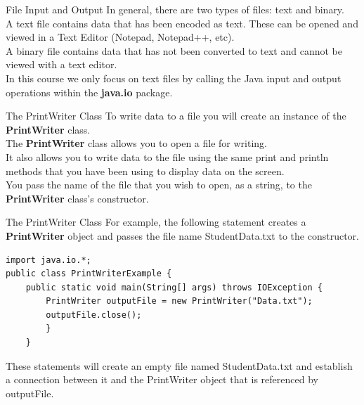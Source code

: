 \documentclass[11pt]{beamer}
\begin{document}
\begin{frame}{File Input and Output}
    In general, there are two types of files: text and binary. \\ 
    \vspace{1em}
    A text file contains data that has been encoded as text. These can be opened and viewed in a Text Editor (Notepad, Notepad++, etc). \\ 
    \vspace{1em}
    A binary file contains data that has not been converted to text and cannot be viewed with a text editor. \\ 
    \vspace{1em}
    In this course we only focus on text files by calling the Java input and output operations within the \textbf{java.io} package.
\end{frame}

\begin{frame}{The PrintWriter Class}
    To write data to a file you will create an instance of the \textbf{PrintWriter} class. \\
    \vspace{1em}
    The \textbf{PrintWriter} class allows you to open a file for writing. \\
    \vspace{1em}
    It also allows you to write data to the file using the same print and println methods that you have been using to display data on the screen. \\
    \vspace{1em}
    You pass the name of the file that you wish to open, as a string, to the \textbf{PrintWriter} class’s constructor.
\end{frame}

\begin{frame}[fragile]{The PrintWriter Class}
    For example, the following statement creates a \textbf{PrintWriter} object and passes the file name StudentData.txt to the constructor.    
    \begin{lstlisting}
import java.io.*;
public class PrintWriterExample {
	public static void main(String[] args) throws IOException {
		PrintWriter outputFile = new PrintWriter("Data.txt");
		outputFile.close();
		}
	}
    \end{lstlisting}
    These statements will create an empty file named StudentData.txt and establish a connection between it and the PrintWriter object that is referenced by outputFile.
\end{frame}
\end{document}

